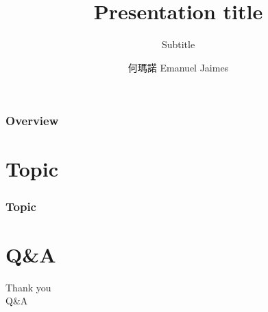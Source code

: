 \documentclass{beamer}
\title{Presentation title}
\subtitle{Subtitle}
\institute{Deptartment of Mechanical Engineering}
\author{何瑪諾 Emanuel Jaimes}
\date{}
\begin{document}
\begin{frame}
  \titlepage
\end{frame}
  \begin{frame}
    \frametitle{Overview}
    \tableofcontents
  \end{frame}

  \section{Topic}
  \begin{frame}
    \frametitle{Topic}
  \end{frame}


  \section{Q\&A}
  \begin{frame}
    \centering
    \LARGE{Thank you \\}
    \vspace{2em}
    \LARGE{Q\&A}
  \end{frame}
\end{document}

